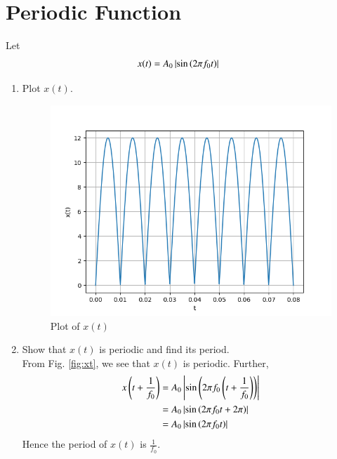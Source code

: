 \documentclass[journal,12pt,twocolumn]{IEEEtran}
\renewcommand\thesection{\arabic{section}}
\begin{document}
\section{Periodic Function}
Let 
\begin{align}
	x(t) &= A_0\left\vert\sin\left(2\pi f_0 t\right)\right\vert
	\label{eq:10-orig-diff-def}
\end{align}
\begin{enumerate}[label=\thesection.\arabic*
,ref=\thesection.\theenumi]
\item Plot $x(t)$.\\
\solution 
\begin{figure}[!ht]
	\centering
	\includegraphics[width=\columnwidth]{./figs/1_1.png}
	\caption{Plot of $x(t)$}
	\label{fig:xt}	
\end{figure}
\item Show that $x(t)$ is periodic and find its period.\\
\solution From Fig. \eqref{fig:xt}, we see that $x(t)$ is periodic. Further,
\begin{align}
    x\left(t+\frac{1}{f_0}\right) &= A_0\left\vert\sin\left(2\pi f_0\left(t + \frac{1}{f_0}\right)\right)\right\vert \\
                            &= A_0\left\vert\sin\left(2\pi f_0t +2\pi\right)\right\vert \\
                            &= A_0\left\vert\sin\left(2\pi f_0t\right)\right\vert
\end{align}
Hence the period of $x(t)$ is $\frac{1}{f_0}$.
\end{enumerate}
\end{document}
